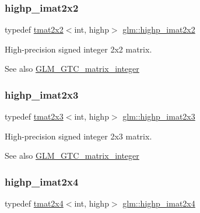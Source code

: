 \subsubsection{\texorpdfstring{highp\+\_\+imat2x2}{highp\_imat2x2}}
{\footnotesize\ttfamily typedef \hyperlink{structglm_1_1tmat2x2}{tmat2x2}$<$int, highp$>$ \hyperlink{group__gtc__matrix__integer_gab4411f2d106d24a32aaa3cb711dc8510}{glm\+::highp\+\_\+imat2x2}}

High-\/precision signed integer 2x2 matrix. \begin{DoxySeeAlso}{See also}
\hyperlink{group__gtc__matrix__integer}{G\+L\+M\+\_\+\+G\+T\+C\+\_\+matrix\+\_\+integer} 
\end{DoxySeeAlso}
\mbox{\label{group__gtc__matrix__integer_ga6c1a5f4d85de3f7eccb394970320bafc}} 
\subsubsection{\texorpdfstring{highp\+\_\+imat2x3}{highp\_imat2x3}}
{\footnotesize\ttfamily typedef \hyperlink{structglm_1_1tmat2x3}{tmat2x3}$<$int, highp$>$ \hyperlink{group__gtc__matrix__integer_ga6c1a5f4d85de3f7eccb394970320bafc}{glm\+::highp\+\_\+imat2x3}}

High-\/precision signed integer 2x3 matrix. \begin{DoxySeeAlso}{See also}
\hyperlink{group__gtc__matrix__integer}{G\+L\+M\+\_\+\+G\+T\+C\+\_\+matrix\+\_\+integer} 
\end{DoxySeeAlso}
\mbox{\label{group__gtc__matrix__integer_gae7502957eb2ab9268726d87389ae2b55}} 
\subsubsection{\texorpdfstring{highp\+\_\+imat2x4}{highp\_imat2x4}}
{\footnotesize\ttfamily typedef \hyperlink{structglm_1_1tmat2x4}{tmat2x4}$<$int, highp$>$ \hyperlink{group__gtc__matrix__integer_gae7502957eb2ab9268726d87389ae2b55}{glm\+::highp\+\_\+imat2x4}}


